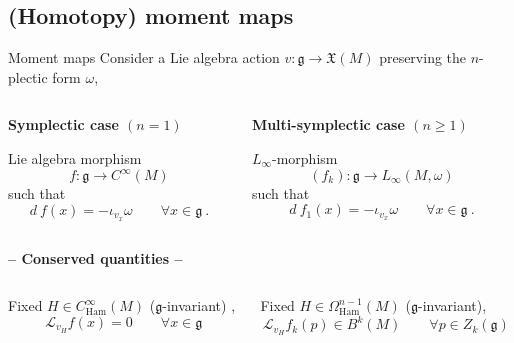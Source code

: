\documentclass[handout,10pt]{beamer}
\begin{document}
\subsection{(Homotopy) moment maps}
\begin{frame}{Moment maps}
	Consider a Lie algebra action $v:\mathfrak{g} \to \mathfrak{X}(M)$  preserving the $n$-plectic form $\omega$,
	\vfill
	\begin{columns}
		\begin{column}{.5\linewidth}	
	\textbf{Symplectic case $(n=1)$}
		\begin{defblock}
			Lie algebra morphism
			$$ f: \mathfrak{g} \to C^\infty(M) $$
			such that
			$$ d~f (x) = -\iota_{v_x} \omega \qquad \forall x \in \mathfrak{g}~.$$
		\end{defblock}		
		\end{column}
		\begin{column}{.5\linewidth}	
	\textbf{Multi-symplectic case $(n\geq 1)$}
		\begin{defblock}
			$L_\infty$-morphism 
			$$ (f_k) : \mathfrak{g} \to L_\infty (M,\omega)$$
			such that
			$$ d~f_1(x) = -\iota_{v_x} \omega \qquad \forall x \in \mathfrak{g}~.$$
		\end{defblock}		
		\end{column}
	\end{columns}	
	\pause
	\centering \textbf{-- Conserved quantities --}
	\begin{columns}
		\begin{column}{.5\linewidth}		
			\begin{propblock}
				\small Fixed $H\in C^\infty_{\text{Ham}}(M)$ ($\mathfrak{g}$-invariant) ,
				$$\mathcal{L}_{v_H} f(x) = 0 \qquad \forall x \in \mathfrak{g}$$
			\end{propblock}
		\end{column}
		\begin{column}{.5\linewidth}			
			\begin{propblock}
				\small Fixed $H\in \Omega^{n-1}_{\text{Ham}}(M)$ ($\mathfrak{g}$-invariant),
				$$\mathcal{L}_{v_H} f_k(p) \in B^k(M) \qquad \forall p \in Z_k(\mathfrak{g})$$			
			\end{propblock}
		\end{column}
	\end{columns}



\end{frame}
\end{document}
